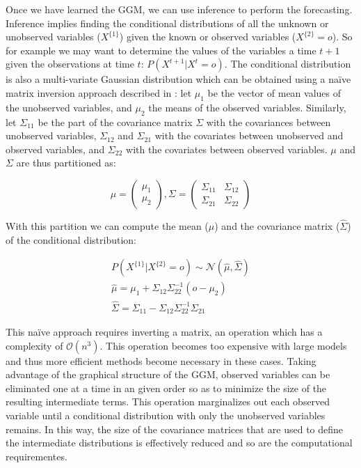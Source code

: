 \documentclass{article}
\begin{document}
Once we have learned the GGM, we can use inference to perform the forecasting.
Inference implies finding the conditional distributions of all the unknown or
unobserved variables ($X^{\{1\}}$) given the known or observed variables
($X^{\{2\}} = o$). So for example we may want to determine the values of the
variables a time $t + 1$ given the observations at time $t$: $P(X^{t+1} | X^t
= o)$. The conditional distribution is also a multi-variate Gaussian
distribution which can be obtained using a na\"ive matrix inversion approach
described in \cite{Koller2009}: let $\mu_1$ be the vector of mean values of the
unobserved variables, and $\mu_2$ the means of the observed variables.
Similarly, let $\Sigma_{11}$ be the part of the covariance matrix $\Sigma$ with
the covariances between unobserved variables, $\Sigma_{12}$ and $\Sigma_{21}$
with the covariates between unobserved and observed variables, and $\Sigma_{22}$
with the covariates between observed variables. $\mu$ and $\Sigma$ are thus
partitioned as:

\begin{equation}
\label{eq:distPartition}
\mu = \left( \begin{array}{ccc}
\mu_1 \\ \mu_2 
\end{array} \right),
\Sigma = \left( \begin{array}{ccc}
\Sigma_{11} & \Sigma_{12} \\
\Sigma_{21} & \Sigma_{22}
\end{array}\right)
\end{equation}

With this partition we can compute the mean ($\hat\mu$) and the covariance
matrix ($\hat\Sigma$) of the conditional distribution:

\begin{eqnarray}
\label{eq:naiveInference1}
P(X^{\{1\}} | X^{\{2\}} = o) \sim \mathcal{N}(\hat\mu, \hat\Sigma) \\
\label{eq:naiveInference2}
\hat\mu = \mu_1 + \Sigma_{12}\Sigma_{22}^{-1}(o - \mu_2) \\
\label{eq:naiveInference3}
\hat\Sigma = \Sigma_{11} - \Sigma_{12}\Sigma_{22}^{-1}\Sigma_{21}
\end{eqnarray}

This na\"ive approach requires inverting a matrix, an operation which has a
complexity of $\mathcal{O}(n^3)$. This operation becomes too expensive with
large models and thus more efficient methods become necessary in these cases.
Taking advantage of the graphical structure of the GGM, observed variables can
be eliminated one at a time in an given order so as to minimize the size of the
resulting intermediate terms. This operation marginalizes out each observed
variable until a conditional distribution with only the unobserved variables
remains. In this way, the size of the covariance matrices that are used to
define the intermediate distributions is effectively reduced and so are the
computational requirementes.
\end{document}
